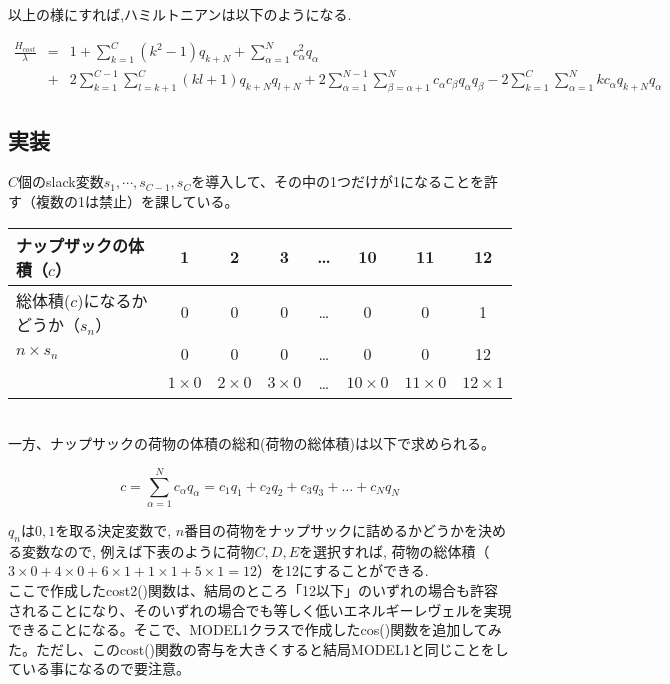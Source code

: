 \documentclass[uplatex,dvipdfmx,a4paper,11pt,oneside,openany]{jsbook}
\begin{document}
以上の様にすれば,ハミルトニアンは以下のようになる.

\begin{eqnarray*}
    \frac{H_{cost}}{\lambda} &=& 1 + \sum _{k=1} ^{C} (k^{2} - 1) q_{k + N} + \sum _{\alpha=1} ^{N} c_{\alpha} ^{2} q_{\alpha}\\
    & +& 2\sum _{k=1} ^{C-1} \sum _{l=k+1}^{C} (kl + 1) q_{k+N}q_{l+N} + 2\sum _{\alpha = 1} ^{N-1} \sum _{\beta = \alpha + 1} ^{N} c_{\alpha} c_{\beta} q_{\alpha} q_{\beta} - 2 \sum_{k=1} ^{C} \sum _{\alpha=1} ^{N} kc_{\alpha} q_{k+N} q_{\alpha}
\end{eqnarray*}

\subsection{実装}

$C$個のslack変数$s_1, \cdots, s_{C-1}, s_C$を導入して、その中の1つだけが1になることを許す（複数の1は禁止）を課している。\\

\begin{tabular}{|l|c|c|c|c|c|c|c|}\hline
  ナップザックの体積（$c$） & 1 & 2 & 3 & \dots & 10 & 11 & 12 \\\hline
  総体積($c$)になるかどうか（$s_n$） & 0 & 0 & 0 & \dots & 0 & 0 & 1 \\\hline
  $n\times s_n$ & 0 & 0 & 0 & \dots & 0 & 0 & 12 \\
  & $1\times 0$ & $2\times 0$ & $3\times 0$ & \dots & $10\times 0$ & $11\times 0$ & $12\times 1$ \\\hline
 \end{tabular}\\

一方、ナップサックの荷物の体積の総和(荷物の総体積)は以下で求められる。

\[
c = \sum_{\alpha=1}^{N}c_\alpha q_\alpha = c_1 q_1 + c_2 q_2 + c_3 q_3 + \dots + c_N q_N
\]

$q_n$は$0,1$を取る決定変数で, $n$番目の荷物をナップサックに詰めるかどうかを決める変数なので, 例えば下表のように荷物$C,D,E$を選択すれば, 荷物の総体積（$3\times 0+4\times 0+6\times 1+1\times 1+5\times 1=12$）を12にすることができる.\\



ここで作成したcost2()関数は、結局のところ「12以下」のいずれの場合も許容されることになり、そのいずれの場合でも等しく低いエネルギーレヴェルを実現できることになる。そこで、MODEL1クラスで作成したcos()関数を追加してみた。ただし、このcost()関数の寄与を大きくすると結局MODEL1と同じことをしている事になるので要注意。
\end{document}
